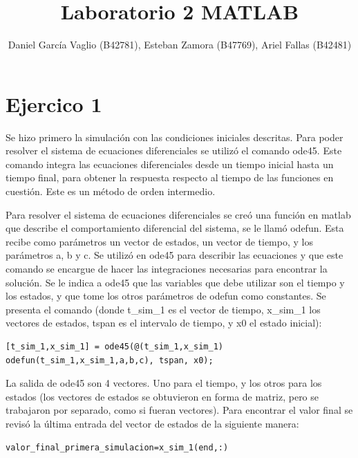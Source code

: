 \documentclass[12pt,letterpaper]{article}
\begin{document}
\title{Laboratorio 2 MATLAB}
\author{Daniel García Vaglio (B42781), Esteban Zamora (B47769), Ariel Fallas (B42481)}
\maketitle

\section{Ejercico 1}
Se hizo primero la simulación con las condiciones iniciales descritas. Para poder resolver el sistema de ecuaciones diferenciales se utilizó el comando ode45. Este comando integra las ecuaciones diferenciales desde un tiempo inicial hasta un tiempo final, para obtener la respuesta respecto al tiempo de las funciones en cuestión. Este es un método de orden intermedio. 

Para resolver el sistema de ecuaciones diferenciales se creó una función en matlab que describe el comportamiento diferencial del sistema, se le llamó odefun. Esta recibe como parámetros un vector de estados, un vector de tiempo, y los parámetros a, b y c. Se utilizó en ode45 para describir las ecuaciones y que este comando se encargue de hacer las integraciones necesarias para encontrar la solución. Se le indica  a ode45 que las variables que debe utilizar son el tiempo y los estados, y que tome los otros parámetros de odefun como constantes. Se presenta el comando (donde t\_sim\_1 es el vector de tiempo, x\_sim\_1 los vectores de estados, tspan es el intervalo de tiempo, y x0 el estado inicial):

\begin{lstlisting}[style=Matlab-editor, basicstyle=\mlttfamily]
    [t_sim_1,x_sim_1] = ode45(@(t_sim_1,x_sim_1) odefun(t_sim_1,x_sim_1,a,b,c), tspan, x0);
\end{lstlisting}

La salida de ode45 son 4 vectores. Uno para el tiempo, y los otros para los estados (los vectores de estados se obtuvieron en forma de matriz, pero se trabajaron por separado, como si fueran vectores). Para encontrar el valor final se revisó la última entrada del vector de estados de la siguiente manera:


\begin{lstlisting}[style=Matlab-editor, basicstyle=\mlttfamily]
    valor_final_primera_simulacion=x_sim_1(end,:)
\end{lstlisting}
\end{document}
